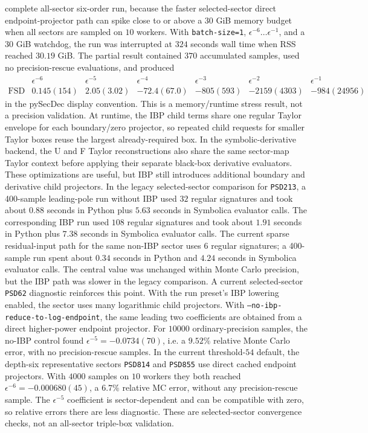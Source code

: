 \documentclass[11pt]{article}
\newcommand{\eps}{\epsilon}
\begin{document}
complete all-sector six-order run, because the faster selected-sector direct
endpoint-projector path can spike close to or above a \(30\) GiB memory budget
when all sectors are sampled on \(10\) workers.  With
\texttt{batch-size=1}, \(\eps^{-6}\ldots\eps^{-1}\), and a \(30\) GiB
watchdog, the run was interrupted at \(324\) seconds wall time when RSS reached
\(30.19\) GiB.  The partial result contained \(370\) accumulated samples,
used no precision-rescue evaluations, and produced
\[
\begin{array}{c|rrrrrr}
  & \eps^{-6} & \eps^{-5} & \eps^{-4}
  & \eps^{-3} & \eps^{-2} & \eps^{-1} \\ \hline
  \mathrm{FSD} &
  0.145(154) & 2.05(3.02) & -72.4(67.0) &
  -805(593) & -2159(4303) & -984(24956)
\end{array}
\]
in the pySecDec display convention.  This is a memory/runtime stress result,
not a precision validation.
At runtime, the IBP child terms share one regular Taylor envelope for each
boundary/zero projector, so repeated child requests for smaller Taylor boxes
reuse the largest already-required box.  In the symbolic-derivative backend,
the U and F Taylor reconstructions also share the same sector-map Taylor
context before applying their separate black-box derivative evaluators.  These
optimizations are useful, but IBP still introduces additional boundary and
derivative child projectors.  In the legacy selected-sector comparison for
\texttt{PSD213}, a 400-sample leading-pole run without IBP used \(32\) regular
signatures and took about \(0.88\) seconds in Python plus \(5.63\) seconds in
Symbolica evaluator calls.  The corresponding IBP run used \(108\) regular
signatures and took about \(1.91\) seconds in Python plus \(7.38\) seconds in
Symbolica evaluator calls.  The current sparse residual-input path for the
same non-IBP sector uses \(6\) regular signatures; a 400-sample run spent about
\(0.34\) seconds in Python and \(4.24\) seconds in Symbolica evaluator calls.
The central value was unchanged within Monte Carlo precision, but the IBP path
was slower in the legacy comparison.
A current selected-sector \texttt{PSD62} diagnostic reinforces this point.  With
the run preset's IBP lowering enabled, the sector uses many logarithmic child
projectors.  With \texttt{--no-ibp-reduce-to-log-endpoint}, the same leading
two coefficients are obtained from a direct higher-power endpoint projector.
For \(10000\) ordinary-precision samples, the no-IBP control found
\(\eps^{-5}=-0.0734(70)\), i.e. a \(9.52\%\) relative Monte Carlo error, with
no precision-rescue samples.  In the current threshold-\(54\) default, the
depth-six representative sectors \texttt{PSD814} and \texttt{PSD855} use
direct cached endpoint projectors.  With \(4000\) samples on \(10\) workers
they both reached \(\eps^{-6}=-0.000680(45)\), a \(6.7\%\) relative MC error,
without any precision-rescue sample.  The \(\eps^{-5}\) coefficient is
sector-dependent and can be compatible with zero, so relative errors there are
less diagnostic.  These are selected-sector convergence checks, not an
all-sector triple-box validation.
\end{document}
